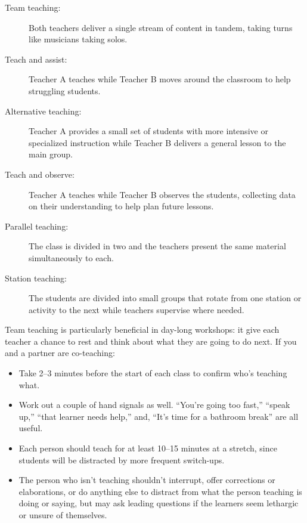 \documentclass[10pt,letterpaper]{article}
\begin{document}
\begin{description}

\item[Team teaching:]
  Both teachers deliver a single stream of content in tandem,
  taking turns like musicians taking solos.

\item[Teach and assist:]
  Teacher A teaches while Teacher B moves around the classroom
  to help struggling students.

\item[Alternative teaching:]
  Teacher A provides a small set of students with more intensive or specialized instruction
  while Teacher B delivers a general lesson to the main group.

\item[Teach and observe:]
  Teacher A teaches while Teacher B observes the students,
  collecting data on their understanding to help plan future lessons.

\item[Parallel teaching:]
  The class is divided in two
  and the teachers present the same material simultaneously to each.

\item[Station teaching:]
  The students are divided into small groups
  that rotate from one station or activity to the next
  while teachers supervise where needed.

\end{description}

Team teaching is particularly beneficial in day-long workshops:
it give each teacher a chance to rest and think about what they are going to do next.
If you and a partner are co-teaching:

\begin{itemize}

\item
  Take 2--3 minutes before the start of each class
  to confirm who's teaching what.

\item
  Work out a couple of hand signals as well.
  ``You're going too fast,''
  ``speak up,''
  ``that learner needs help,''
  and, ``It's time for a bathroom break'' are all useful.

\item
  Each person should teach for at least 10--15 minutes at a stretch,
  since students will be distracted by more frequent switch-ups.

\item
  The person who isn't teaching shouldn't interrupt,
  offer corrections or elaborations,
  or do anything else to distract from what the person teaching is doing or saying,
  but may ask leading questions
  if the learners seem lethargic or unsure of themselves.

\end{itemize}
\end{document}
